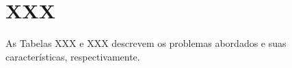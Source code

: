\apendice
\chapter{XXX} 
\thispagestyle{plain}

As Tabelas XXX e XXX descrevem os problemas abordados e suas características, respectivamente.


